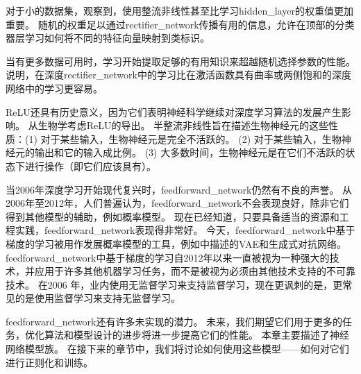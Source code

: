 对于小的数据集，\cite{Jarrett-ICCV2009-small}观察到，使用整流非线性甚至比学习\gls{hidden_layer}的权重值更加重要。
随机的权重足以通过\gls{rectifier_network}传播有用的信息，允许在顶部的分类器层学习如何将不同的特征向量映射到类标识。

当有更多数据可用时，学习开始提取足够的有用知识来超越随机选择参数的性能。
\cite{Glorot+al-AI-2011-small}说明，在深度\gls{rectifier_network}中的学习比在激活函数具有曲率或两侧饱和的深度网络中的学习更容易。

\gls{ReLU}还具有历史意义，因为它们表明神经科学继续对深度学习算法的发展产生影响。
\cite{Glorot+al-AI-2011-small}从生物学考虑\gls{ReLU}的导出。
半整流非线性旨在描述生物神经元的这些性质：(1) 对于某些输入，生物神经元是完全不活跃的。
(2) 对于某些输入，生物神经元的输出和它的输入成比例。
(3) 大多数时间，生物神经元是在它们不活跃的状态下进行操作（即它们应该具有）。
  
  
当2006年深度学习开始现代复兴时，\gls{feedforward_network}仍然有不良的声誉。
从2006年至2012年，人们普遍认为，\gls{feedforward_network}不会表现良好，除非它们得到其他模型的辅助，例如概率模型。
现在已经知道，只要具备适当的资源和工程实践，\gls{feedforward_network}表现得非常好。
今天，\gls{feedforward_network}中基于梯度的学习被用作发展概率模型的工具，例如中描述的\gls{VAE}和生成式对抗网络。
\gls{feedforward_network}中基于梯度的学习自2012年以来一直被视为一种强大的技术，并应用于许多其他机器学习任务，而不是被视为必须由其他技术支持的不可靠技术。
在2006 年，业内使用无监督学习来支持监督学习，现在更讽刺的是，更常见的是使用监督学习来支持无监督学习。

\gls{feedforward_network}还有许多未实现的潜力。
未来，我们期望它们用于更多的任务，优化算法和模型设计的进步将进一步提高它们的性能。
本章主要描述了神经网络模型族。
在接下来的章节中，我们将讨论如何使用这些模型——如何对它们进行正则化和训练。

  
  
